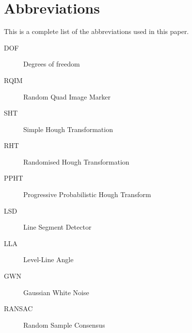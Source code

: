 \chapter*{Abbreviations}
This is a complete list of the abbreviations used in this paper.

\begin{description}
	\item[DOF] Degrees of freedom
	\item[RQIM] Random Quad Image Marker
	\item[SHT] Simple Hough Transformation
	\item[RHT] Randomised Hough Transformation
	\item[PPHT] Progressive Probabilistic Hough Transform
	\item[LSD] Line Segment Detector
	\item[LLA] Level-Line Angle
	\item[GWN] Gaussian White Noise
	\item[RANSAC] Random Sample Consensus
\end{description}